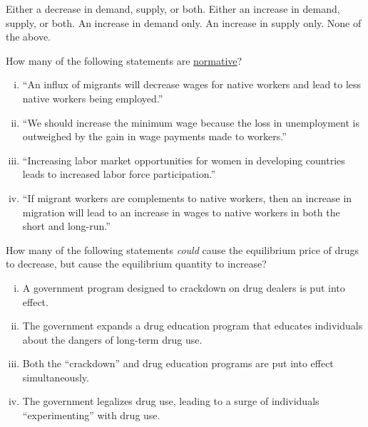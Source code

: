 \documentclass[addpoints,11pt]{exam}
\theoremstyle{definition}
\begin{document}
\begin{questions}
\begin{choices}
	\choice Either a decrease in demand, supply, or both.
	\CorrectChoice Either an increase in demand, supply, or both. 
	\choice An increase in demand only.
	\choice An increase in supply only.
	\choice None of the above.
\end{choices}

\newpage

\question How many of the following statements are \underline{normative}?

\begin{enumerate}[i.]
	\item ``An influx of migrants will decrease wages for native workers and lead to less native workers being employed.''
	\item ``We should increase the minimum wage because the loss in unemployment is outweighed by the gain in wage payments made to workers.''
	\item ``Increasing labor market opportunities for women in developing countries leads to increased labor force participation.''
	\item ``If migrant workers are complements to native workers, then an increase in migration will lead to an increase in wages to native workers in both the short and long-run.'' 
\end{enumerate}

\begin{choices}
\end{choices}

\question How many of the following statements \textit{could} cause the equilibrium price of drugs to decrease, but cause the equilibrium quantity to increase?

\begin{enumerate}[i.]
	\item A government program designed to crackdown on drug dealers is put into effect.
	\item The government expands a drug education program that educates individuals about the dangers of long-term drug use. 
	\item Both the 	``crackdown'' and drug education programs are put into effect simultaneously.
	\item The government legalizes drug use, leading to a surge of individuals ``experimenting'' with drug use. 
\end{enumerate}

\begin{choices}
\end{choices}




\end{questions}
\end{document}
